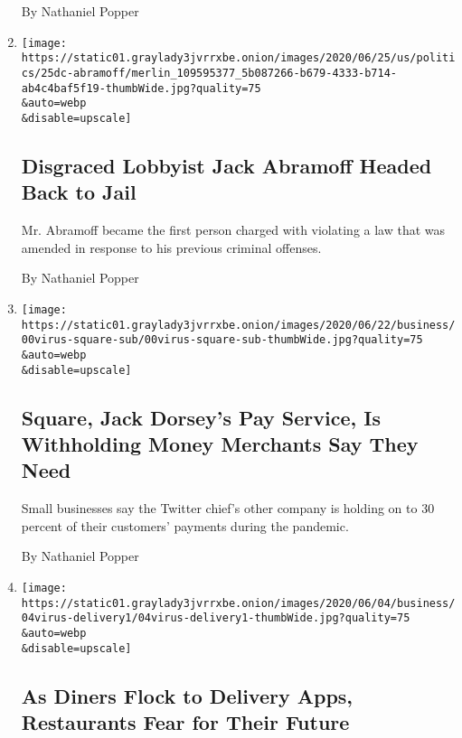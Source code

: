 \begin{enumerate}
  By Nathaniel Popper
\item
  \href{/2020/06/25/us/politics/jack-abramoff-marijuana-cryptocurrency.html}{}

  \texttt{[image: https://static01.graylady3jvrrxbe.onion/images/2020/06/25/us/politics/25dc-abramoff/merlin\_109595377\_5b087266-b679-4333-b714-ab4c4baf5f19-thumbWide.jpg?quality=75\\\&auto=webp\\\&disable=upscale]}

  \hypertarget{disgraced-lobbyist-jack-abramoff-headed-back-to-jail}{%
  \subsection{Disgraced Lobbyist Jack Abramoff Headed Back to
  Jail}\label{disgraced-lobbyist-jack-abramoff-headed-back-to-jail}}

  Mr. Abramoff became the first person charged with violating a law that
  was amended in response to his previous criminal offenses.

  By Nathaniel Popper
\item
  \href{/2020/06/23/technology/square-jack-dorsey-pandemic-withholding.html}{}

  \texttt{[image: https://static01.graylady3jvrrxbe.onion/images/2020/06/22/business/00virus-square-sub/00virus-square-sub-thumbWide.jpg?quality=75\\\&auto=webp\\\&disable=upscale]}

  \hypertarget{square-jack-dorseys-pay-service-is-withholding-money-merchants-say-they-need}{%
  \subsection{Square, Jack Dorsey's Pay Service, Is Withholding Money
  Merchants Say They
  Need}\label{square-jack-dorseys-pay-service-is-withholding-money-merchants-say-they-need}}

  Small businesses say the Twitter chief's other company is holding on
  to 30 percent of their customers' payments during the pandemic.

  By Nathaniel Popper
\item
  \href{/2020/06/09/technology/delivery-apps-restaurants-fees-virus.html}{}

  \texttt{[image: https://static01.graylady3jvrrxbe.onion/images/2020/06/04/business/04virus-delivery1/04virus-delivery1-thumbWide.jpg?quality=75\\\&auto=webp\\\&disable=upscale]}

  \hypertarget{as-diners-flock-to-delivery-apps-restaurants-fear-for-their-future}{%
  \subsection{As Diners Flock to Delivery Apps, Restaurants Fear for
  Their
  Future}\label{as-diners-flock-to-delivery-apps-restaurants-fear-for-their-future}}


\end{enumerate}
